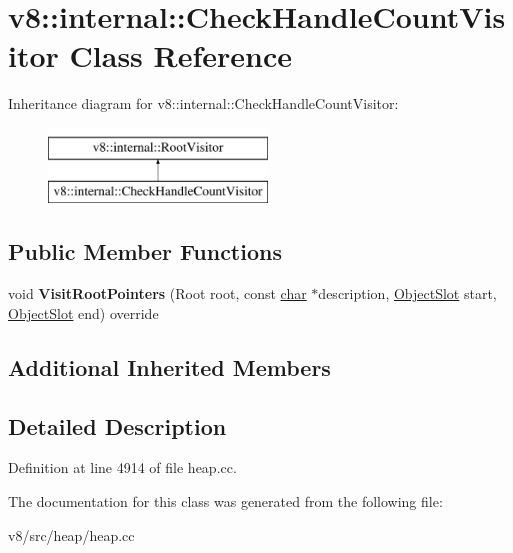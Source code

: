 \hypertarget{classv8_1_1internal_1_1CheckHandleCountVisitor}{}\section{v8\+:\+:internal\+:\+:Check\+Handle\+Count\+Visitor Class Reference}
\label{classv8_1_1internal_1_1CheckHandleCountVisitor}
Inheritance diagram for v8\+:\+:internal\+:\+:Check\+Handle\+Count\+Visitor\+:\begin{figure}[H]
\begin{center}
\leavevmode
\includegraphics[height=2.000000cm]{classv8_1_1internal_1_1CheckHandleCountVisitor}
\end{center}
\end{figure}
\subsection*{Public Member Functions}
\begin{DoxyCompactItemize}
\item 
\mbox{\label{classv8_1_1internal_1_1CheckHandleCountVisitor_aad3d97e6a7a7d12c804faa099a65fae0}} 
void {\bfseries Visit\+Root\+Pointers} (Root root, const \mbox{\hyperlink{classchar}{char}} $\ast$description, \mbox{\hyperlink{classv8_1_1internal_1_1ObjectSlot}{Object\+Slot}} start, \mbox{\hyperlink{classv8_1_1internal_1_1ObjectSlot}{Object\+Slot}} end) override
\end{DoxyCompactItemize}
\subsection*{Additional Inherited Members}


\subsection{Detailed Description}


Definition at line 4914 of file heap.\+cc.



The documentation for this class was generated from the following file\+:\begin{DoxyCompactItemize}
\item 
v8/src/heap/heap.\+cc\end{DoxyCompactItemize}
